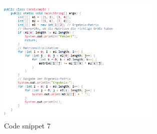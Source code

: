 \begin{figure}[H]
    \centering
    \includegraphics[width=0.7\textwidth]{figures/codeb.png}
    \caption{Code snippet 7}
    \label{fig:appendix-example}
\end{figure}




